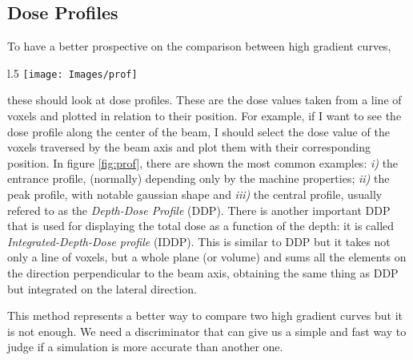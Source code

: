 \documentclass[12pt, a4paper, twoside]{book}
\begin{document}
\subsection{Dose Profiles}
\label{sec:dose_prof}
To have a better prospective on the comparison between high gradient curves,
\begin{wrapfigure}{l}{.5\textwidth}
\vspace{-5mm}
{\texttt{[image: Images/prof]}}
\caption{Profiles example}
\label{fig:prof}
\vspace{-5mm}
\end{wrapfigure}
\noindent these should look at dose profiles. 
These are the dose values taken from a line of voxels and plotted in relation to their position. For example, if I want to see the dose profile along the center of the beam, I should select the dose value of the voxels traversed by the beam axis and plot them with their corresponding position.
In figure \ref{fig:prof}, there are shown the most common examples: \emph{i)} the entrance profile, (normally) depending only by the machine properties; \emph{ii)} the peak profile, with notable gaussian shape and \emph{iii)} the central profile, usually refered to as the \emph{Depth-Dose Profile} (DDP). There is another important DDP that is used for displaying the total dose as a function of the depth: it is called \emph{Integrated-Depth-Dose profile} (IDDP). This is similar to DDP but it takes not only a line of voxels, but a whole plane (or volume) and sums all the elements on the direction perpendicular to the beam axis, obtaining the same thing as DDP but integrated on the lateral direction.

This method represents a better way to compare two high gradient curves but it is not enough. We need a discriminator that can give us a simple and fast way to judge if a simulation is more accurate than another one.
\end{document}
